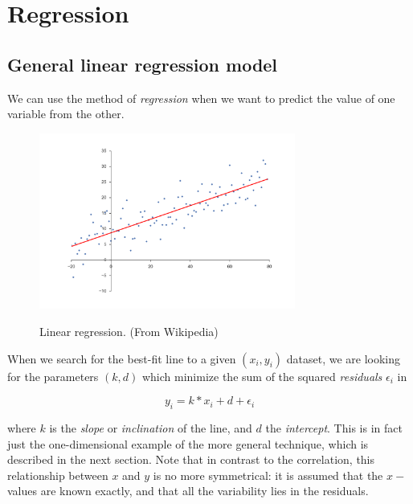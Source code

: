 

\section{Regression} 

\subsection{General linear regression model}

We can use the method of \emph{regression} when we want to predict the value of one variable from the other.

\begin{figure}
  \centering
  \includegraphics[width=0.75\textwidth]{../Images/Linear_regression.png}\\
  \caption{Linear regression. (From Wikipedia)}\label{fig:regression}
\end{figure}

When we search for the best-fit line to a given $(x_i,y_i)$ dataset, we are looking for the parameters $(k,d)$ which minimize the sum of the squared \emph{residuals} $\epsilon_i$ in

\begin{equation}\label{eq:simpleRegression}
  y_i = k * x_i + d + \epsilon_i
\end{equation}

where $k$ is the \emph{slope} or \emph{inclination} of the line, and $d$ the \emph{intercept}. This is in fact just the one-dimensional example of the more general technique, which is described in the next section.
Note that in contrast to the correlation, this relationship between $x$ and $y$ is no more symmetrical: it is assumed that the $x-$values are known exactly, and that all the variability lies in the residuals.

